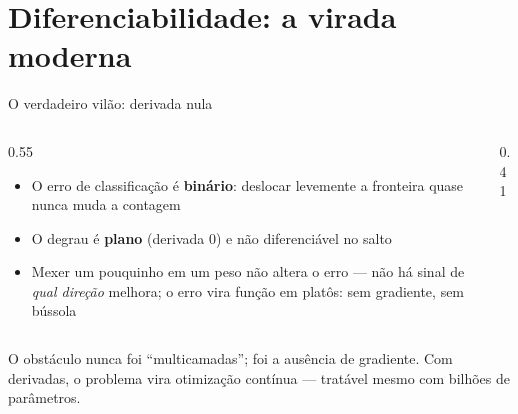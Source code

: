 \documentclass[aspectratio=169, 11pt]{beamer}
\begin{document}
\section{Diferenciabilidade: a virada moderna}

\begin{frame}{O verdadeiro vilão: derivada nula}
  \begin{columns}[T]
    \begin{column}{0.55\textwidth}
      \begin{itemize}\setlength{\itemsep}{0.4ex}
        \item O erro de classificação é \textbf{binário}: deslocar levemente a
              fronteira quase nunca muda a contagem
        \item O degrau é \textbf{plano} (derivada $0$) e não diferenciável
              no salto
        \item Mexer um pouquinho em um peso \alert{não altera o erro} — não há
              sinal de \emph{qual direção} melhora; o erro vira função em
              platôs: sem gradiente, sem bússola
      \end{itemize}
    \end{column}
    \begin{column}{0.41\textwidth}
      \begin{center}
      \end{center}
    \end{column}
  \end{columns}

  \begin{alertabox}
    O obstáculo nunca foi ``multicamadas''; foi \alert{a ausência de gradiente}.
    Com derivadas, o problema vira otimização contínua — tratável mesmo com
    bilhões de parâmetros.
  \end{alertabox}
\end{frame}
\end{document}

